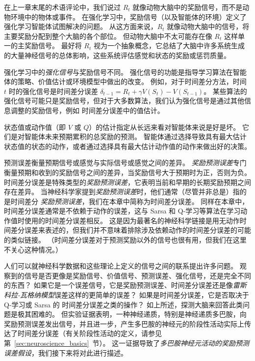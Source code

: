 在上一章末尾的术语评论中，我们说过 $ R_t $ 就像动物大脑中的奖励信号，而不是动物环境中的物体或事件。
在强化学习中，奖励信号（以及智能体的环境）定义了强化学习智能体试图解决的问题。
从这方面来说，$ R_t $ 就像动物大脑中的信号，将主要奖励分配到整个大脑的各个部位。
但动物大脑中不太可能存在像 $ R_t $ 这样单一的主奖励信号。
最好将 $ R_t $ 视为一个抽象概念，它总结了大脑中许多系统生成的大量神经信号的总体影响，这些系统评估感觉和状态的奖励或惩罚质量。


强化学习中的\textit{强化信号}与奖励信号不同。
强化信号的功能是指导学习算法在智能体的策略、价值估计或环境模型中做出的改变。
例如，对于时间差分方法，时间 $ t $ 时的强化信号是时间差分误差 $ \delta_{t-1} = R_t + \gamma V(S_t) - V(S_{t-1})$。
某些算法的强化信号可能只是奖励信号，但对于大多数算法，我们认为强化信号是通过其他信息调整的奖励信号，例如 时间差分误差中的值估计。


状态值或动作值（即 $ V $ 或 $ Q $）的估计指定从长远来看对智能体来说是好是坏。
它们是对智能体未来预期累积的总奖励的预测。
智能体通过选择导致具有最大估计状态值的状态的动作，或者通过选择具有最大估计动作值的动作来做出好的决策。


预测误差衡量预期信号或感觉与实际信号或感觉之间的差异。
\textit{奖励预测误差}专门衡量预期和收到的奖励信号之间的差异，当奖励信号大于预期时为正，否则为负。 
时间差分误差是特殊类型的\textit{奖励预测误差}，它表明当前和早期的长期奖励预期之间存在差异。
当神经科学家提到\textit{奖励预测误差}时，他们通常（尽管并非总是）指的是时间差分 \textit{奖励预测误差}，我们在本章中简称为时间差分误差。
同样在本章中，时间差分误差通常是不依赖于动作的误差，这与 Sarsa 和 Q-学习等算法在学习动作值时使用的时间差分误差相反。
这是因为最著名的神经科学链接是用无动作时间差分误差来表述的，但我们并不意味着排除涉及依赖动作的时间差分误差的可能的类似链接。
（时间差分误差对于预测奖励以外的信号也很有用，但我们在这里不关心这种情况\cite{modayil2014prediction}。）


人们可以就神经科学数据和这些理论上定义的信号之间的联系提出许多问题。
观察到的信号是否更像是奖励信号、价值信号、预测误差、强化信号，还是完全不同的东西？
如果它是一个误差信号，它是奖励预测误差、时间差分误差还是像\textit{雷斯科拉-瓦格纳模型}误差这样的更简单的误差？
如果是时间差分误差，它是否取决于 Q-学习或 Sarsa 的 时间差分误差之类的操作？
如上所述，探测大脑来回答此类问题是极其困难的。
但实验证据表明，一种神经递质，特别是神经递质多巴胺，向奖励预测误差发出信号，并且进一步，产生多巴胺的神经元的阶段性活动实际上传达了时间差分误差（有关阶段性活动的定义，请参见第~\ref{sec:neuroscience_basics}~节）。
这一证据导致了\textit{多巴胺神经元活动的奖励预测误差假设}，我们接下来将对此进行描述。


